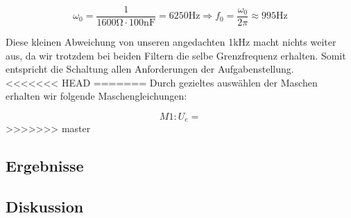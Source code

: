 $$\omega_{0}=\frac{1}{1600\si{\ohm}\cdot 100\si{\nano\farad}}=6250\si{\hertz}\Rightarrow f_{0}=\frac{\omega_{0}}{2\pi}\approx 995\si{\hertz}$$

Diese kleinen Abweichung von unseren angedachten 1\si{\kilo\hertz} macht nichts weiter aus, da wir trotzdem bei beiden Filtern die selbe Grenzfrequenz erhalten.
Somit entspricht die Schaltung allen Anforderungen der Aufgabenstellung.\\
<<<<<<< HEAD
=======
Durch gezieltes auswählen der Maschen erhalten wir folgende Maschengleichungen:

$$M1:U_{e}=$$
>>>>>>> master


\subsection{Ergebnisse}

\subsection{Diskussion}


